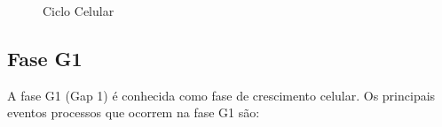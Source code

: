 \documentclass[11pt,a4paper]{article}
\begin{document}
	\begin{figure}[h]
		\centering
	\end{figure}
	\begin{figure}[h]
		\centering
		\caption{Ciclo Celular}
		\label{fig:cicloCelular}
	\end{figure}
	
	\subsection{Fase G1}

	A fase G1 (Gap 1) é conhecida como fase de crescimento celular. Os principais eventos processos que ocorrem na fase G1 são:
\end{document}
